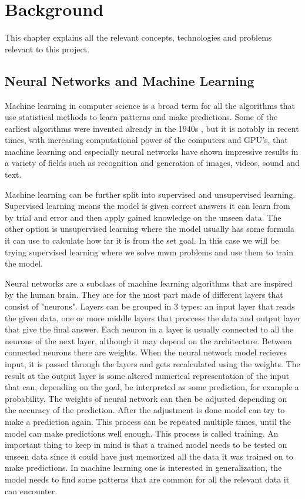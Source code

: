 \chapter{Background}
\label{sec:background}

This chapter explains all the relevant concepts, technologies and problems relevant to this project.

\section{Neural Networks and Machine Learning}

Machine learning in computer science is a broad term for all the algorithms that use statistical methods to learn patterns and make predictions. Some of the earliest algorithms were invented already in the 1940s \cite{mlhist}, but it is notably in recent times, with increasing computational power of the computers and GPU's, that machine learning and especially neural networks have shown impressive results in a variety of fields such as recognition and generation of images, videos, sound and text. 

Machine learning can be further split into supervised and unsupervised learning. Supervised learning means the model is given correct answers it can learn from by trial and error and then apply gained knowledge on the unseen data. The other option is unsupervised learning where the model usually has some formula it can use to calculate how far it is from the set goal. In this case we will be trying supervised learning where we solve \gls{mwm} problems and use them to train the model.

Neural networks are a subclass of machine learning algorithms that are inspired by the human brain. They are for the most part made of different layers that consist of "neurons". Layers can be grouped in 3 types: an input layer that reads the given data, one or more middle layers that proccess the data and output layer that give the final answer. Each neuron in a layer is usually connected to all the neurons of the next layer, although it may depend on the architecture. Between connected neurons there are weights. When the neural network model recieves input, it is passed through the layers and gets recalculated using the weights. The result at the output layer is some altered numerical representation of the input that can, depending on the goal, be interpreted as some prediction, for example a probability. The weights of neural network can then be adjusted depending on the accuracy of the prediction. After the adjustment is done model can try to make a prediction again. This process can be repeated multiple times, until the model can make predictions well enough. This process is called training. An important thing to keep in mind is that a trained model needs to be tested on unseen data since it could have just memorized all the data it was trained on to make predictions. In machine learning one is interested in generalization, the model needs to find some patterns that are common for all the relevant data it can encounter.

